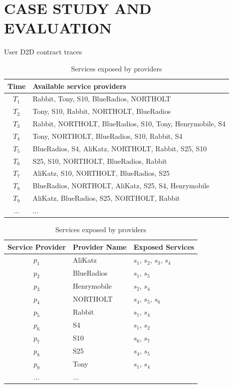 \documentclass[journal]{IEEEtran}
\begin{document}
\section{CASE STUDY AND EVALUATION}
\begin{table}
\renewcommand{\arraystretch}{1.5}
\parbox{.45\linewidth}{
\caption{User D2D contract traces}
\label{D2D contract traces}
\begin{tabular}{c l}
\hline
\bfseries Time & \bfseries Available service providers\\
\hline
$T_1$ & Rabbit, Tony, S10, BlueRadios, NORTHOLT\\
$T_2$ & Tony, S10, Rabbit, NORTHOLT, BlueRadios\\
$T_3$ & Rabbit, NORTHOLT, BlueRadios, S10, Tony, Henrymobile, S4 \\
$T_4$ & Tony, NORTHOLT, BlueRadios, S10, Rabbit, S4\\
$T_5$ & BlueRadios, S4, AliKatz, NORTHOLT, Rabbit, S25, S10\\
$T_6$ & S25, S10, NORTHOLT, BlueRadios, Rabbit\\
$T_7$ & AliKatz, S10, NORTHOLT, BlueRadios, S25\\
$T_8$ & BlueRadios, NORTHOLT, AliKatz, S25, S4, Henrymobile\\
$T_9$ & AliKatz, BlueRadios, S25, NORTHOLT, Rabbit\\
... & ...\\
\hline
\end{tabular}

}
\hfill
\parbox{.45\linewidth}{
\caption{Services exposed by providers}
\label{Services exposed by providers}
\begin{tabular}{cll}
\hline
\bfseries Service Provider & \bfseries Provider Name  & \bfseries Exposed Services\\
\hline
$p_1$ & AliKatz     & $s_1$, $s_2$, $s_3$, $s_4$\\
$p_2$ & BlueRadios  & $s_1$, $s_5$\\
$p_3$ & Henrymobile & $s_2$, $s_4$\\
$p_4$ & NORTHOLT    & $s_4$, $s_5$, $s_6$ \\
$p_5$ & Rabbit      & $s_1$, $s_4$\\
$p_6$ & S4          & $s_1$, $s_2$\\
$p_7$ & S10         & $s_6$, $s_7$\\
$p_8$ & S25         & $s_4$, $s_5$\\
$p_9$ & Tony        & $s_1$, $s_4$\\
... & ...\\
\hline
\end{tabular}
}
\end{table}
\end{document}
